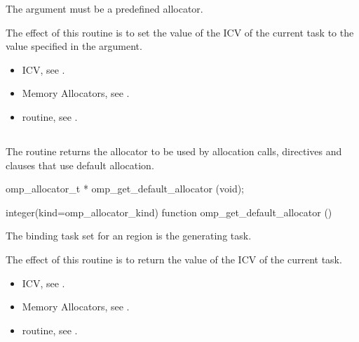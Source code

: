 \constraints

The  argument must be a predefined allocator.

\effect

The effect of this routine is to set the value of the  ICV of the current task to the value specified in the  argument. 

\crossreferences

\begin{itemize}
\item {} ICV, see .
\item Memory Allocators, see .
\item {} routine, see .
\end{itemize}

\subsection{}
\label{subsec:omp_get_default_allocator}

\summary
The  routine returns the allocator to be used by allocation calls, directives and clauses that use default allocation.

\format
\ccppspecificstart
\begin{boxedcode}
omp_allocator_t * omp_get_default_allocator (void);
\end{boxedcode}
\ccppspecificend
\fortranspecificstart
\begin{boxedcode}
integer(kind=omp_allocator_kind) 
function omp_get_default_allocator ()
\end{boxedcode}
\fortranspecificend

\binding

The binding task set for an  region is the generating task.

\effect

The effect of this routine is to return the value of the  ICV of the current task.

\crossreferences
\begin{itemize}
\item {} ICV, see .
\item Memory Allocators, see .
\item {} routine, see .
\end{itemize}

